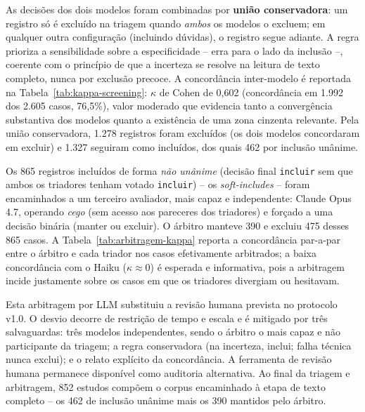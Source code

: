 As decisões dos dois modelos foram combinadas por \textbf{união conservadora}: um registro só é excluído na triagem quando \emph{ambos} os modelos o excluem; em qualquer outra configuração (incluindo dúvidas), o registro segue adiante. A regra prioriza a sensibilidade sobre a especificidade -- erra para o lado da inclusão --, coerente com o princípio de que a incerteza se resolve na leitura de texto completo, nunca por exclusão precoce. A concordância inter-modelo é reportada na Tabela~\ref{tab:kappa-screening}: $\kappa$ de Cohen de 0,602 (concordância em 1.992 dos 2.605 casos, 76,5\%), valor moderado que evidencia tanto a convergência substantiva dos modelos quanto a existência de uma zona cinzenta relevante. Pela união conservadora, 1.278 registros foram excluídos (os dois modelos concordaram em excluir) e 1.327 seguiram como incluídos, dos quais 462 por inclusão unânime.




Os 865 registros incluídos de forma \emph{não unânime} (decisão final \texttt{incluir} sem que ambos os triadores tenham votado \texttt{incluir}) -- os \textit{soft-includes} -- foram encaminhados a um terceiro avaliador, mais capaz e independente: Claude Opus 4.7, operando \emph{cego} (sem acesso aos pareceres dos triadores) e forçado a uma decisão binária (manter ou excluir). O árbitro manteve 390 e excluiu 475 desses 865 casos. A Tabela~\ref{tab:arbitragem-kappa} reporta a concordância par-a-par entre o árbitro e cada triador nos casos efetivamente arbitrados; a baixa concordância com o Haiku ($\kappa \approx 0$) é esperada e informativa, pois a arbitragem incide justamente sobre os casos em que os triadores divergiam ou hesitavam.

Esta arbitragem por LLM substituiu a revisão humana prevista no protocolo v1.0. O desvio decorre de restrição de tempo e escala e é mitigado por três salvaguardas: três modelos independentes, sendo o árbitro o mais capaz e não participante da triagem; a regra conservadora (na incerteza, inclui; falha técnica nunca exclui); e o relato explícito da concordância. A ferramenta de revisão humana permanece disponível como auditoria alternativa. Ao final da triagem e arbitragem, 852 estudos compõem o corpus encaminhado à etapa de texto completo -- os 462 de inclusão unânime mais os 390 mantidos pelo árbitro.


